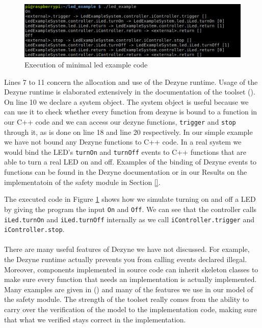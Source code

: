 \documentclass[12pt]{scrreprt}
\begin{document}
\begin{figure}[H]
    \centering
    \includegraphics[width=\textwidth]{Figures/theoretical_background/executed.png}
    \caption{Execution of minimal led example code}
    \label{Execution of minimal led example code}
\end{figure}

Lines 7 to 11 concern the allocation and use of the Dezyne runtime. Usage of the Dezyne runtime is elaborated extensively in the documentation of the toolset (\cite{dzndoc}). On line 10 we declare a system object. The system object is useful because we can use it to check whether every function from dezyne is bound to a function in our C++ code and we can access our dezyne functions, \texttt{trigger} and \texttt{stop} through it, as is done on line 18 and line 20 respectively. In our simple example we have not bound any Dezyne functions to C++ code. In a real system we would bind the LED's \texttt{turnOn} and \texttt{turnOff} events to C++ functions that are able to turn a real LED on and off. Examples of the binding of Dezyne events to functions can be found in the Dezyne documentation or in our Results on the implementatoin of the safety module in Section \ref{}. 
\par
The executed code in Figure \ref{Execution of minimal led example code} shows how we simulate turning on and off a LED by giving the program the input \texttt{On} and \texttt{Off}. We can see that the controller calls \texttt{iLed.turnOn} and \texttt{iLed.turnOff} internally as we call \texttt{iController.trigger} and \texttt{iController.stop}.
\\\\
There are many useful features of Dezyne we have not discussed. For example, the Dezyne runtime actually prevents you from calling events declared illegal. Moreover, components implemented in source code can inherit skeleton classes to make sure every function that needs an implementation is actually implemented. Many examples are given in (\cite{dzntut}) and many of the features we use in our model of the safety module. The strength of the toolset really comes from the ability to carry over the verification of the model to the implementation code, making sure that what we verified stays correct in the implementation.
\end{document}
